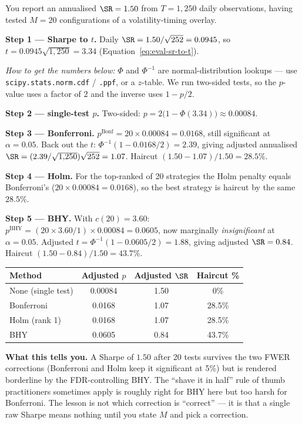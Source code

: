\begin{workedexample}
You report an annualised $\SR = 1.50$ from $T = 1{,}250$ daily observations, having tested $M = 20$ configurations of a volatility-timing overlay.

\textbf{Step 1 --- Sharpe to $t$.} Daily $\SR = 1.50/\sqrt{252} = 0.0945$, so $t = 0.0945\sqrt{1{,}250} = 3.34$ (Equation~\eqref{eq:eval-sr-to-t}).

\textit{How to get the numbers below:} $\Phi$ and $\Phi^{-1}$ are normal-distribution lookups --- use \texttt{scipy.stats.norm.cdf} / \texttt{.ppf}, or a $z$-table. We run two-sided tests, so the $p$-value uses a factor of $2$ and the inverse uses $1 - p/2$.

\textbf{Step 2 --- single-test $p$.} Two-sided: $p = 2\bigl(1 - \Phi(3.34)\bigr) \approx 0.00084$.

\textbf{Step 3 --- Bonferroni.} $p^{\text{Bonf}} = 20 \times 0.00084 = 0.0168$, still significant at $\alpha = 0.05$. Back out the $t$: $\Phi^{-1}(1 - 0.0168/2) = 2.39$, giving adjusted annualised $\SR = (2.39/\sqrt{1{,}250})\sqrt{252} = 1.07$. Haircut $(1.50 - 1.07)/1.50 = 28.5\%$.

\textbf{Step 4 --- Holm.} For the top-ranked of 20 strategies the Holm penalty equals Bonferroni's ($20 \times 0.00084 = 0.0168$), so the best strategy is haircut by the same $28.5\%$.

\textbf{Step 5 --- BHY.} With $c(20) = 3.60$: $p^{\text{BHY}} = (20 \times 3.60 / 1)\times 0.00084 = 0.0605$, now marginally \emph{insignificant} at $\alpha = 0.05$. Adjusted $t = \Phi^{-1}(1 - 0.0605/2) = 1.88$, giving adjusted $\SR = 0.84$. Haircut $(1.50 - 0.84)/1.50 = 43.7\%$.

\medskip
\begin{center}
\begin{tabular}{lccc}
\toprule
\textbf{Method} & \textbf{Adjusted $p$} & \textbf{Adjusted $\SR$} & \textbf{Haircut \%} \\
\midrule
None (single test) & 0.00084 & 1.50 & 0\% \\
Bonferroni & 0.0168 & 1.07 & 28.5\% \\
Holm (rank 1) & 0.0168 & 1.07 & 28.5\% \\
BHY & 0.0605 & 0.84 & 43.7\% \\
\bottomrule
\end{tabular}
\end{center}
\medskip

\textbf{What this tells you.}
A Sharpe of $1.50$ after 20 tests survives the two FWER corrections (Bonferroni and Holm keep it significant at 5\%) but is rendered borderline by the FDR-controlling BHY.
The ``shave it in half'' rule of thumb practitioners sometimes apply is roughly right for BHY here but too harsh for Bonferroni.
The lesson is not which correction is ``correct'' --- it is that a single raw Sharpe means nothing until you state $M$ and pick a correction.
\end{workedexample}

